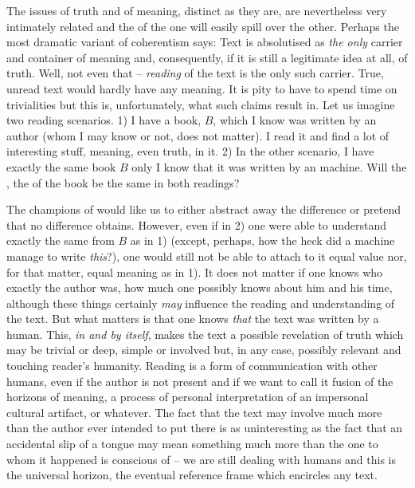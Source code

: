 \pa
The issues of truth and of meaning, distinct as they are, are nevertheless very
intimately related and the  of the one will easily spill over
the other. Perhaps the most dramatic variant of coherentism says: 
Text is absolutised as {\em the only}
carrier and container of meaning and, consequently, if it is still a 
legitimate idea at all, of truth.
Well, not even that -- {\em reading} of the text is the only such carrier.
True, unread text would hardly have any meaning.  It is pity to have to spend
time on trivialities but this is, unfortunately, what such claims result in.
Let us imagine two reading scenarios.  1) I have a book, $B$, which I know was
written by an author (whom I may know or not, does not matter).  I read it and
find a lot of interesting stuff, meaning, even truth, in it.  2) In the other
scenario, I have exactly the same book $B$ only I know that it was written by
an  machine.
Will the , the  of the book be the same in both
readings?

The champions of  would like us to either abstract away the
difference or pretend that no difference obtains.  However, even if in 2) one
were able to understand exactly the same from $B$ as in 1) (except, perhaps, how
the heck did a machine manage to write {\em this}?), one would still not be able
to attach to it equal value nor, for that matter, equal meaning as in 1).  It
does not matter if one knows who exactly the author was, how much one possibly
knows about him and his time, although these things {certainly} {\em may}
influence the reading and understanding of the text.  But what matters is that
one knows {\em that} the text was written by a human.  This, {\em in and by itself},
makes the text a possible revelation of truth which may be trivial or deep,
simple or involved but, in any case, possibly relevant and touching reader's
humanity.  Reading is a form of communication with other humans, even if the
author is not present and if we want to call it fusion of the horizons of meaning,
 a process of personal interpretation of an impersonal
cultural artifact, or whatever.  The fact that the text may involve much more
than the author ever intended to put there is as uninteresting as the fact that
an accidental slip of a tongue may mean something much more than the one to whom
it happened is conscious of -- we are still dealing with humans and this is the
universal horizon, the eventual reference frame which encircles any
text.

